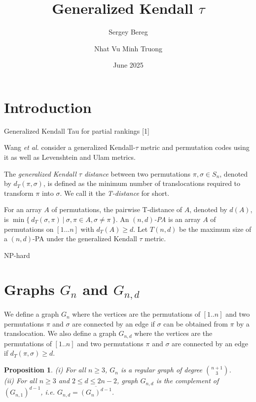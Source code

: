 \documentclass[runningheads]{llncs}
\newtheorem{prop}[theorem]{Proposition}
\newcommand{\etal}{\emph{et al.}}
\begin{document}
\title{Generalized Kendall $\tau$}
\author{Sergey Bereg%
\and
Nhat Vu Minh Truong%
}

\date{June 2025}



\maketitle

\section{Introduction}
Generalized Kendall Tau for partial rankings [1]

Wang \etal \cite{wang24} consider a generalized Kendall‑$\tau$ metric and permutation codes using it as well as Levenshtein and Ulam metrics.

The {\em generalized Kendall $\tau$ distance} between two permutations $\pi, \sigma \in S_n$, denoted by $d_T(\pi, \sigma)$, is defined as the minimum number of translocations required to transform $\pi$ into $\sigma$.
We call it the {\em T-distance} for short.

For an array $A$ of permutations, the pairwise T-distance of $A$, denoted by $d(A)$, 
is $\min \{ ~d_T(\sigma,\pi)~ |~ \sigma, \pi \in A, \sigma\ne \pi ~ \}$. 
An {\em $(n,d)$-PA} is an array $A$ of permutations on $[1...n]$ with $d_T(A)\ge d$. 
Let $T(n,d)$ be the maximum size of a $(n,d)$-PA under the generalized Kendall $\tau$ metric.


NP-hard \cite{bult12}

\section{Graphs $G_n$ and $G_{n,d}$}

We define a graph $G_n$ where the vertices are the permutations of $[1..n]$ and two permutations $\pi$ and $\sigma$ are connected by an edge if $\sigma$ can be obtained from $\pi$ by a translocation.
We also define a graph $G_{n,d}$ where the vertices are the permutations of $[1..n]$ and two permutations $\pi$ and $\sigma$ are connected by an edge if $d_T(\pi,\sigma)\ge d$.

\begin{prop}
\label{prop1}
(i) For all $n\ge 3$, $G_n$ is a regular graph of degree $\binom{n+1}{3}$.
\\
(ii) For all $n\ge 3$ and $2\le d\le 2n-2$,
graph $G_{n,d}$ is the complement of $(G_{n,1})^{d-1}$, i.e. 
$G_{n,d}=\overline{(G_n)^{d-1}}$.
\end{prop}
\end{document}
